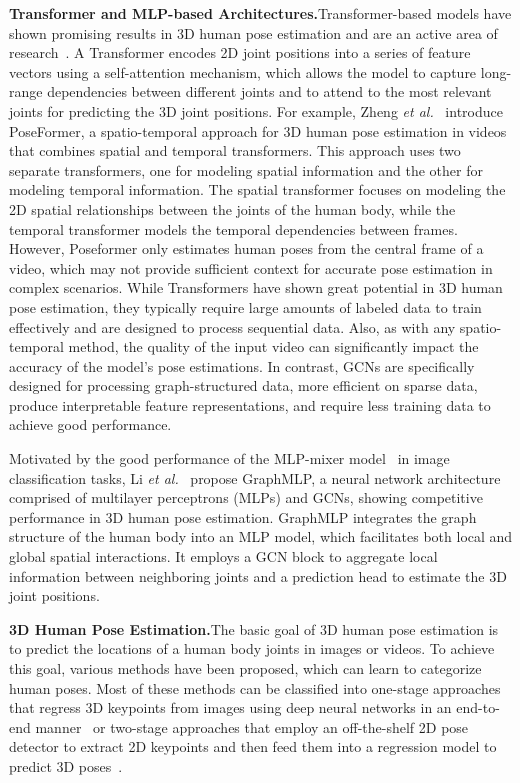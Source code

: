 \documentclass[10pt,journal]{IEEEtran}
\begin{document}
\medskip\noindent\textbf{Transformer and MLP-based Architectures.}\quad Transformer-based models have shown promising results in 3D human pose estimation and are an active area of research~\cite{Weixi2021GraFormer,PoseFormer:2021,Jinlu2022Mix,Zhang2022Aware,Kevin2021End,Sha2022PSTMO,Li2022Strided,Einfalt2023Uplift}. A Transformer encodes 2D joint positions into a series of feature vectors using a self-attention mechanism, which allows the model to capture long-range dependencies between different joints and to attend to the most relevant joints for predicting the 3D joint positions. For example, Zheng \textit{et al.}~\cite{PoseFormer:2021} introduce PoseFormer, a spatio-temporal approach for 3D human pose estimation in videos that combines spatial and temporal transformers. This approach uses two separate transformers, one for modeling spatial information and the other for modeling temporal information. The spatial transformer focuses on modeling the 2D spatial relationships between the joints of the human body, while the temporal transformer models the temporal dependencies between frames. However, Poseformer only estimates human poses from the central frame of a video, which may not provide sufficient context for accurate pose estimation in complex scenarios. While Transformers have shown great potential in 3D human pose estimation, they typically require large amounts of labeled data to train effectively and are designed to process sequential data. Also, as with any spatio-temporal method, the quality of the input video can significantly impact the accuracy of the model's pose estimations. In contrast, GCNs are specifically designed for processing graph-structured data, more efficient on sparse data, produce interpretable feature representations, and require less training data to achieve good performance.

Motivated by the good performance of the MLP-mixer model~\cite{tolstikhin2021mlp} in image classification tasks, Li \textit{et al.}~\cite{Wenhao22GraphMLP} propose GraphMLP, a neural network architecture comprised of multilayer perceptrons (MLPs) and GCNs, showing competitive performance in 3D human pose estimation. GraphMLP integrates the graph structure of the human body into an MLP model, which facilitates both local and global spatial interactions. It employs a GCN block to aggregate local information between neighboring joints and a prediction head to estimate the 3D joint positions.

\medskip\noindent\textbf{3D Human Pose Estimation.}\quad The basic goal of 3D human pose estimation is to predict the locations of a human body joints in images or videos. To achieve this goal, various methods have been proposed, which can learn to categorize human poses. Most of these methods can be classified into one-stage approaches that regress 3D keypoints from images using deep neural networks in an end-to-end manner~\cite{li20143d} or two-stage approaches that employ an off-the-shelf 2D pose detector to extract 2D keypoints and then feed them into a regression model to predict 3D poses~\cite{yang20183d,fang2018learning,rayat2018exploiting,pavlakos2018ordinal,sharma2019monocular,ge20193d,pavllo20193d,zhao2019semantic,YujunCai:19,HaiCi:2019,
liu2020comprehensive,zou2020high}.
\end{document}
